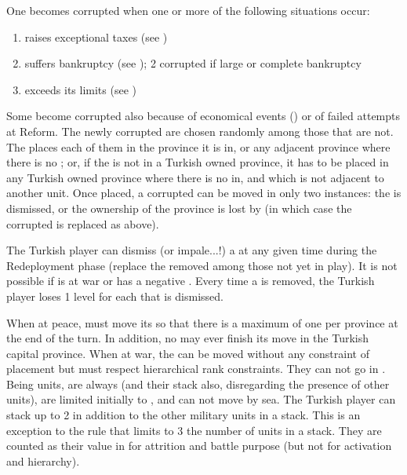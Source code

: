 \bparag[Decadence.] One \Pasha becomes corrupted when one or more of the
following situations occur:
\begin{enumerate}
\item \TUR raises exceptional taxes (see )
\item \TUR suffers bankruptcy (see ); 2
  corrupted \Pasha if large or complete bankruptcy
\item \TUR exceeds its \MNU limits (see )
\end{enumerate}
\bparag Some \Pashas become corrupted also because of economical events
() or of failed attempts at
Reform.
\bparag The newly corrupted \Pashas are chosen randomly among those that
are not. The \SDCF places each of them in the province it is in, or any
adjacent province where there is no \Pasha; or, if the \Pasha is not in
a Turkish owned province, it has to be placed in any Turkish owned
province where there is no \Pasha in, and which is not adjacent to
another \Pasha unit. Once placed, a corrupted \Pasha can be moved in
only two instances: the \Pasha is dismissed, or the ownership of the
province is lost by \TUR (in which case the corrupted \Pasha is replaced
as above).

 The Turkish player can dismiss (or
impale...!) a \Pasha at any given time during the Redeployment phase
(replace the removed \Pasha among those not yet in play). It is not
possible if \TUR is at war or has a negative \STAB.  Every time a \Pasha
is removed, the Turkish player loses 1 \STAB level for each \Pasha that
is dismissed.

\bparag When at peace, \TUR must move its \Pashas so that there is a
maximum of one \Pasha per province at the end of the turn. In addition,
no \Pasha may ever finish its move in the Turkish capital province.
\bparag When at war, the \Pashas can be moved without any constraint of
placement but must respect hierarchical rank constraints. They can not
go in \ROTW.
\bparag Being \Timar units, \Pashas are always  (and
their stack also, disregarding the presence of other 
units), are limited initially to \TARQ, and can not move by sea.
 The Turkish player can stack up to 2
\Pashas in addition to the other military units in a stack. This is an
exception to the rule that limits to 3 the number of units in a
stack. They are counted as their value in \LD for attrition and battle
purpose (but not for activation and hierarchy).

